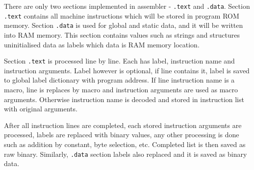 There are only two sections implemented in assembler - \texttt{.text} and \texttt{.data}. Section \texttt{.text} contains all machine instructions which will be stored in program ROM memory. Section \texttt{.data} is used for global and static data, and it will be written into RAM memory. This section contains values such as strings and structures uninitialised data as labels which data is RAM memory location. 

Section \texttt{.text} is processed line by line. Each has label, instruction name and instruction arguments. Label however is optional, if line contains it, label is saved to global label dictionary with program address. If line instruction name is a macro, line is replaces by macro and instruction arguments are used as macro arguments. Otherwise instruction name is decoded and stored in instruction list with original arguments.

After all instruction lines are completed, each stored instruction arguments are processed, labels are replaced with binary values, any other processing is done such as addition by constant, byte selection, etc. Completed list is then saved as raw binary. Similarly, \texttt{.data} section labels also replaced and it is saved as binary data.







